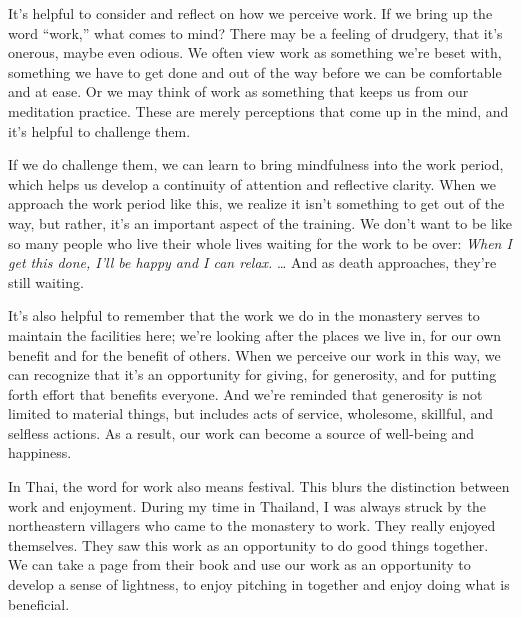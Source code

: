 
It's helpful to consider and reflect on how we perceive work. If we 
bring up the word ``work,'' what comes to mind? There may be a feeling 
of drudgery, that it's onerous, maybe even odious. We often view work 
as something we're beset with, something we have to get done and out of 
the way before we can be comfortable and at ease. Or we may think of 
work as something that keeps us from our meditation practice. These are 
merely perceptions that come up in the mind, and it's helpful to 
challenge them.

If we do challenge them, we can learn to bring mindfulness into the 
work period, which helps us develop a continuity of attention and 
reflective clarity. When we approach the work period like this, we 
realize it isn't something to get out of the way, but rather, it's an 
important aspect of the training. We don't want to be like so many 
people who live their whole lives waiting for the work to be over: 
\emph{When I get this done, I'll be happy and I can relax.} … And as 
death approaches, they're still waiting.

It's also helpful to remember that the work we do in the monastery 
serves to maintain the facilities here; we're looking after the places 
we live in, for our own benefit and for the benefit of others. When we 
perceive our work in this way, we can recognize that it's an 
opportunity for giving, for generosity, and for putting forth effort 
that benefits everyone. And we're reminded that generosity is not 
limited to material things, but includes acts of service, wholesome, 
skillful, and selfless actions. As a result, our work can become a 
source of well-being and happiness.

In Thai, the word for work also means festival. This blurs the 
distinction between work and enjoyment. During my time in Thailand, I 
was always struck by the northeastern villagers who came to the 
monastery to work. They really enjoyed themselves. They saw this work 
as an opportunity to do good things together. We can take a page from 
their book and use our work as an opportunity to develop a sense of 
lightness, to enjoy pitching in together and enjoy doing what is 
beneficial.

